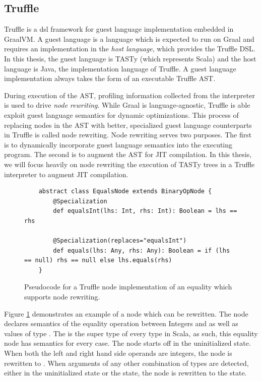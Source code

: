 \subsection{Truffle}

Truffle is a \acrfull{dsl} framework for guest language implementation embedded in GraalVM.
A guest language is a language which is expected to run on Graal and requires an implementation in the \textit{host language}, which provides the Truffle DSL.
In this thesis, the guest language is TASTy (which represents Scala) and the host language is Java, the implementation language of Truffle.
A guest language implementation always takes the form of an executable Truffle AST.

During execution of the AST, profiling information collected from the interpreter is used to drive \textit{node rewriting}.
While Graal is language-agnostic, Truffle is able exploit guest language semantics for dynamic optimizations.
This process of replacing nodes in the AST with better, specialized guest language counterparts in Truffle is called node rewriting.
Node rewriting serves two purposes.
The first is to dynamically incorporate guest language semantics into the executing program.
The second is to augment the AST for JIT compilation. 
In this thesis, we will focus heavily on node rewriting the execution of TASTy trees in a Truffle interpreter to augment JIT compilation.

\begin{figure}[!htb]
	\begin{verbatim}
	abstract class EqualsNode extends BinaryOpNode {
		@Specialization
		def equalsInt(lhs: Int, rhs: Int): Boolean = lhs == rhs
		
		@Specialization(replaces="equalsInt")
		def equals(lhs: Any, rhs: Any): Boolean = if (lhs == null) rhs == null else lhs.equals(rhs)
	}
	\end{verbatim}
	\caption{Pseudocode for a Truffle node implementation of an equality which supports node rewriting.}
	\label{example:node-rewriting}
\end{figure}

Figure \ref{example:node-rewriting} demonstrates an example of a node which can be rewritten.
The node declares semantics of the equality operation between Integers and as well as values of type .
The  is the super type of every type in Scala, as such, this equality node has semantics for every case.
The node starts off in the uninitialized state.
When both the left and right hand side operands are integers, the node is rewritten to .
When arguments of any other combination of types are detected, either in the uninitialized state or the  state, the node is rewritten to the  state.

